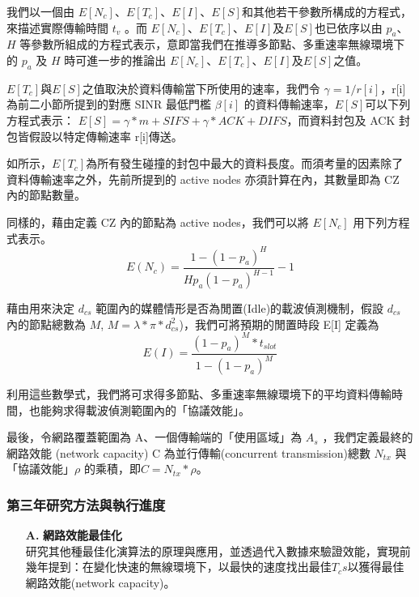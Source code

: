 \documentclass[12pt,a4paper]{article}
\begin{document}
\begin{description}
\begin{enumerate}
我們以一個由 $E[N_c]$、$E[T_c]$、$E[I]$、$E[S]$和其他若干參數所構成的方程式，來描述實際傳輸時間 $t_v$ 。而 $E[N_c]$、$E[T_c]$、$E[I]$及$E[S]$也已依序以由 $p_a$、$H$ 等參數所組成的方程式表示，意即當我們在推導多節點、多重速率無線環境下的 $p_a$ 及 $H$ 時可進一步的推論出 $E[N_c]$、$E[T_c]$、$E[I]$及$E[S]$之值。

$E[T_c]$與$E[S]$之值取決於資料傳輸當下所使用的速率，我們令 $\gamma = 1/r[i]$，r[i]為前二小節所提到的對應 SINR 最低門檻 $\beta[i]$ 的資料傳輸速率，$E[S]$可以下列方程式表示： $E[S]=\gamma*m+SIFS+\gamma*ACK+DIFS$，而資料封包及 ACK 封包皆假設以特定傳輸速率 r[i]傳送。

如\cite{tn00_cali}所示，$E[T_c]$為所有發生碰撞的封包中最大的資料長度。而須考量的因素除了資料傳輸速率之外，先前所提到的 active nodes 亦須計算在內，其數量即為 CZ 內的節點數量。

同樣的，藉由定義 CZ 內的節點為 active nodes，我們可以將 $E[N_c]$ 用下列方程式表示。
$$
E(N_c) =  \frac{1-(1-p_a)^H}{Hp_a(1-p_a)^{H-1}} -1
$$

藉由用來決定 $d_{cs}$ 範圍內的媒體情形是否為閒置(Idle)的載波偵測機制，假設 $d_{cs}$ 內的節點總數為 $M$, $M = \lambda*\pi*d_{cs}^2$)，我們可將預期的閒置時段 E[I] 定義為
$$
E(I) =  \frac{(1-p_a)^M*t_{slot}}{1-(1-p_a)^M}
$$


利用這些數學式，我們將可求得多節點、多重速率無線環境下的平均資料傳輸時間，也能夠求得載波偵測範圍內的「協議效能」。 

最後，令網路覆蓋範圍為 A、一個傳輸端的「使用區域」為 $A_s$ ，我們定義最終的網路效能 (network capacity) C 為並行傳輸(concurrent transmission)總數 $N_{tx}$ 與「協議效能」$\rho$ 的乘積，即$C = N_{tx}*\rho$。\\

\end{enumerate}

\subsubsection{第三年研究方法與執行進度}
\begin{enumerate}
\setlength\parindent{2em}

\item [\bf A.]{\textbf{\Kai 網路效能最佳化 }}\\

研究其他種最佳化演算法的原理與應用，並透過代入數據來驗證效能，實現前幾年提到：在變化快速的無線環境下，以最快的速度找出最佳$T_cs$以獲得最佳網路效能(network capacity)。


\end{enumerate}
\end{description}
\end{document}
